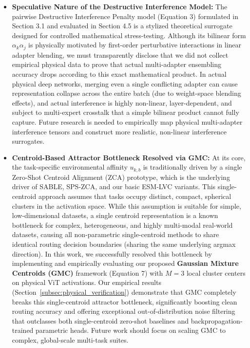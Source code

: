 \begin{itemize}
    \item \textbf{Speculative Nature of the Destructive Interference Model:} The pairwise Destructive Interference Penalty model (Equation 3) formulated in Section 3.1 and evaluated in Section 4.5 is a stylized theoretical surrogate designed for controlled mathematical stress-testing. Although its bilinear form $\alpha_k \alpha_j$ is physically motivated by first-order perturbative interactions in linear adapter blending, we must transparently disclose that we did not collect empirical physical data to prove that actual multi-adapter ensembling accuracy drops according to this exact mathematical product. In actual physical deep networks, merging even a single conflicting adapter can cause representation collapse across the entire batch (due to weight-space blending effects), and actual interference is highly non-linear, layer-dependent, and subject to multi-expert crosstalk that a simple bilinear product cannot fully capture. Future research is needed to empirically map physical multi-adapter interference tensors and construct more realistic, non-linear interference surrogates.

    \item \textbf{Centroid-Based Attractor Bottleneck Resolved via GMC:} At its core, the task-specific environmental affinity $u_{k,b}$ is traditionally driven by a single Zero-Shot Centroid Alignment (ZCA) prototype, which is the underlying driver of SABLE, SPS-ZCA, and our basic ESM-LVC variants. This single-centroid approach assumes that tasks occupy distinct, compact, spherical clusters in the activation space. While this assumption is suitable for simple, low-dimensional datasets, a single centroid representation is a known bottleneck for complex, heterogeneous, and highly multi-modal real-world datasets, causing all non-parametric single-centroid methods to share identical routing decision boundaries (sharing the same underlying argmax direction). In this work, we successfully resolved this bottleneck by implementing and empirically evaluating our proposed \textbf{Gaussian Mixture Centroids (GMC)} framework (Equation 7) with $M=3$ local cluster centers on physical ViT activations. Our empirical results (Section~\ref{subsec:physical_verification}) demonstrate that GMC completely breaks this single-centroid attractor bottleneck, significantly boosting clean routing accuracy and offering exceptional out-of-distribution noise filtering that outclasses both single-centroid zero-shot baselines and backpropagation-trained parametric heads. Future work should focus on scaling GMC to complex, global-scale multi-task suites.
\end{itemize}

